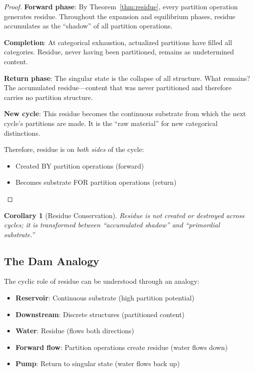 \documentclass[twocolumn,10pt,a4paper]{article}
\newtheorem{corollary}[theorem]{Corollary}
\theoremstyle{definition}
\theoremstyle{remark}
\begin{document}
\begin{proof}
\textbf{Forward phase}: By Theorem~\ref{thm:residue}, every partition operation generates residue. Throughout the expansion and equilibrium phases, residue accumulates as the ``shadow'' of all partition operations.

\textbf{Completion}: At categorical exhaustion, actualized partitions have filled all categories. Residue, never having been partitioned, remains as undetermined content.

\textbf{Return phase}: The singular state is the collapse of all structure. What remains? The accumulated residue---content that was never partitioned and therefore carries no partition structure.

\textbf{New cycle}: This residue becomes the continuous substrate from which the next cycle's partitions are made. It is the ``raw material'' for new categorical distinctions.

Therefore, residue is on \emph{both sides} of the cycle:
\begin{itemize}
    \item Created BY partition operations (forward)
    \item Becomes substrate FOR partition operations (return)
\end{itemize}
\end{proof}

\begin{corollary}[Residue Conservation]
\label{cor:residue_conservation}
Residue is not created or destroyed across cycles; it is transformed between ``accumulated shadow'' and ``primordial substrate.''
\end{corollary}

\subsection{The Dam Analogy}

The cyclic role of residue can be understood through an analogy:

\begin{itemize}
    \item \textbf{Reservoir}: Continuous substrate (high partition potential)
    \item \textbf{Downstream}: Discrete structures (partitioned content)
    \item \textbf{Water}: Residue (flows both directions)
    \item \textbf{Forward flow}: Partition operations create residue (water flows down)
    \item \textbf{Pump}: Return to singular state (water flows back up)
\end{itemize}
\end{document}
